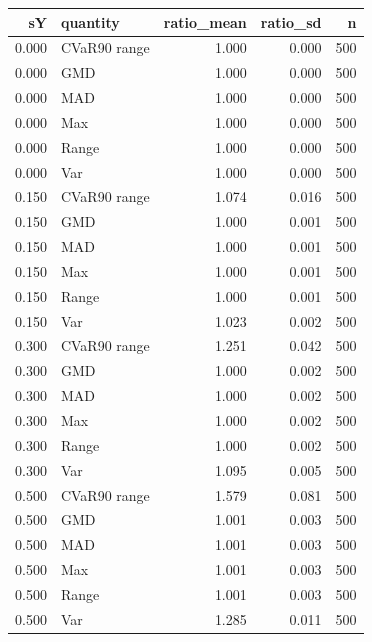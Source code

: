 \begin{tabular}{rlrrr}
\toprule
sY & quantity & ratio\_mean & ratio\_sd & n \\
\midrule
0.000 & CVaR90 range & 1.000 & 0.000 & 500 \\
0.000 & GMD & 1.000 & 0.000 & 500 \\
0.000 & MAD & 1.000 & 0.000 & 500 \\
0.000 & Max & 1.000 & 0.000 & 500 \\
0.000 & Range & 1.000 & 0.000 & 500 \\
0.000 & Var & 1.000 & 0.000 & 500 \\
0.150 & CVaR90 range & 1.074 & 0.016 & 500 \\
0.150 & GMD & 1.000 & 0.001 & 500 \\
0.150 & MAD & 1.000 & 0.001 & 500 \\
0.150 & Max & 1.000 & 0.001 & 500 \\
0.150 & Range & 1.000 & 0.001 & 500 \\
0.150 & Var & 1.023 & 0.002 & 500 \\
0.300 & CVaR90 range & 1.251 & 0.042 & 500 \\
0.300 & GMD & 1.000 & 0.002 & 500 \\
0.300 & MAD & 1.000 & 0.002 & 500 \\
0.300 & Max & 1.000 & 0.002 & 500 \\
0.300 & Range & 1.000 & 0.002 & 500 \\
0.300 & Var & 1.095 & 0.005 & 500 \\
0.500 & CVaR90 range & 1.579 & 0.081 & 500 \\
0.500 & GMD & 1.001 & 0.003 & 500 \\
0.500 & MAD & 1.001 & 0.003 & 500 \\
0.500 & Max & 1.001 & 0.003 & 500 \\
0.500 & Range & 1.001 & 0.003 & 500 \\
0.500 & Var & 1.285 & 0.011 & 500 \\
\bottomrule
\end{tabular}

